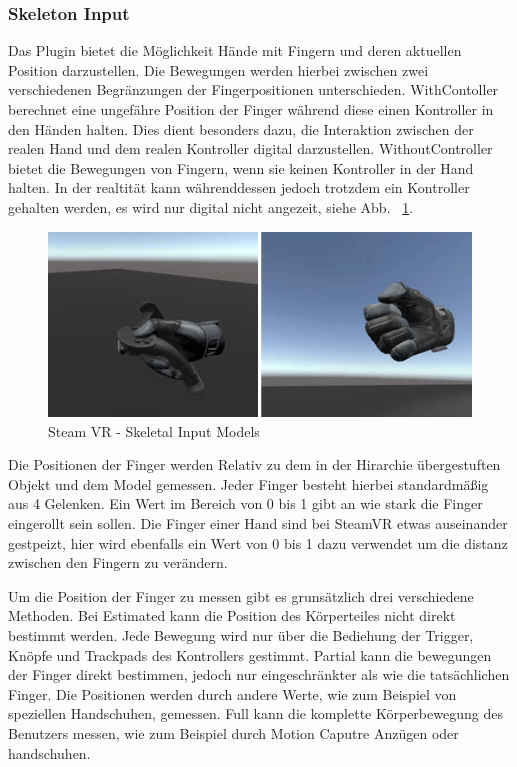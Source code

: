 \subsubsection{Skeleton Input}
Das Plugin bietet die Möglichkeit Hände mit Fingern und deren aktuellen Position darzustellen.
Die Bewegungen werden hierbei zwischen zwei verschiedenen Begränzungen der Fingerpositionen unterschieden.
WithContoller berechnet eine ungefähre Position der Finger während diese einen Kontroller in den Händen halten.
Dies dient besonders dazu, die Interaktion zwischen der realen Hand und dem realen Kontroller digital darzustellen.
WithoutController bietet die Bewegungen von Fingern, wenn sie keinen Kontroller in der Hand halten.
In der realtität kann währenddessen jedoch trotzdem ein Kontroller gehalten werden, es wird nur digital nicht angezeit, siehe Abb. ~\ref{fig:steamvr_skeletal_input_models}.
\begin {figure}
    \centering
    \includegraphics[scale=1]{pics/steamVR_skeletal_input_models}
    \caption{Steam VR - Skeletal Input Models}
    \label{fig:steamvr_skeletal_input_models}
\end {figure}
Die Positionen der Finger werden Relativ zu dem in der Hirarchie übergestuften Objekt und dem Model gemessen.
Jeder Finger besteht hierbei standardmäßig aus 4 Gelenken.
Ein Wert im Bereich von 0 bis 1 gibt an wie stark die Finger eingerollt sein sollen.
Die Finger einer Hand sind bei SteamVR etwas auseinander gestpeizt, hier wird ebenfalls ein Wert von 0 bis 1 dazu verwendet um die distanz zwischen den Fingern zu verändern.

Um die Position der Finger zu messen gibt es grunsätzlich drei verschiedene Methoden.
Bei Estimated kann die Position des Körperteiles nicht direkt bestimmt werden.
Jede Bewegung wird nur über die Bediehung der Trigger, Knöpfe und Trackpads des Kontrollers gestimmt.
Partial kann die bewegungen der Finger direkt bestimmen, jedoch nur eingeschränkter als wie die tatsächlichen Finger.
Die Positionen werden durch andere Werte, wie zum Beispiel von speziellen Handschuhen, gemessen.
Full kann die komplette Körperbewegung des Benutzers messen, wie zum Beispiel durch Motion Caputre Anzügen oder handschuhen.

